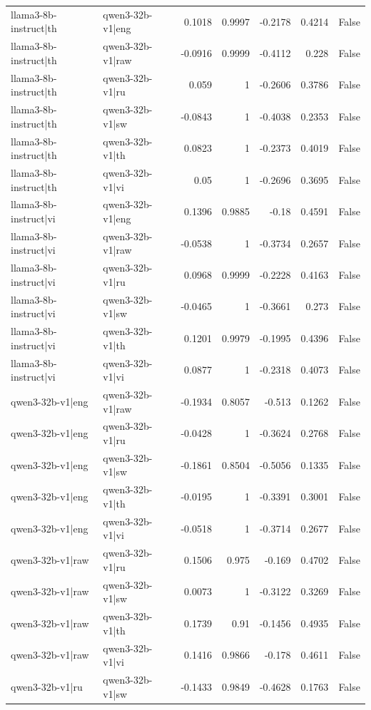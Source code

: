 \begin{table}
\begin{tabular}{l l r r r r l}
llama3-8b-instruct|th & qwen3-32b-v1|eng & 0.1018 & 0.9997 & -0.2178 & 0.4214 & False \\
llama3-8b-instruct|th & qwen3-32b-v1|raw & -0.0916 & 0.9999 & -0.4112 & 0.228 & False \\
llama3-8b-instruct|th & qwen3-32b-v1|ru & 0.059 & 1 & -0.2606 & 0.3786 & False \\
llama3-8b-instruct|th & qwen3-32b-v1|sw & -0.0843 & 1 & -0.4038 & 0.2353 & False \\
llama3-8b-instruct|th & qwen3-32b-v1|th & 0.0823 & 1 & -0.2373 & 0.4019 & False \\
llama3-8b-instruct|th & qwen3-32b-v1|vi & 0.05 & 1 & -0.2696 & 0.3695 & False \\
llama3-8b-instruct|vi & qwen3-32b-v1|eng & 0.1396 & 0.9885 & -0.18 & 0.4591 & False \\
llama3-8b-instruct|vi & qwen3-32b-v1|raw & -0.0538 & 1 & -0.3734 & 0.2657 & False \\
llama3-8b-instruct|vi & qwen3-32b-v1|ru & 0.0968 & 0.9999 & -0.2228 & 0.4163 & False \\
llama3-8b-instruct|vi & qwen3-32b-v1|sw & -0.0465 & 1 & -0.3661 & 0.273 & False \\
llama3-8b-instruct|vi & qwen3-32b-v1|th & 0.1201 & 0.9979 & -0.1995 & 0.4396 & False \\
llama3-8b-instruct|vi & qwen3-32b-v1|vi & 0.0877 & 1 & -0.2318 & 0.4073 & False \\
qwen3-32b-v1|eng & qwen3-32b-v1|raw & -0.1934 & 0.8057 & -0.513 & 0.1262 & False \\
qwen3-32b-v1|eng & qwen3-32b-v1|ru & -0.0428 & 1 & -0.3624 & 0.2768 & False \\
qwen3-32b-v1|eng & qwen3-32b-v1|sw & -0.1861 & 0.8504 & -0.5056 & 0.1335 & False \\
qwen3-32b-v1|eng & qwen3-32b-v1|th & -0.0195 & 1 & -0.3391 & 0.3001 & False \\
qwen3-32b-v1|eng & qwen3-32b-v1|vi & -0.0518 & 1 & -0.3714 & 0.2677 & False \\
qwen3-32b-v1|raw & qwen3-32b-v1|ru & 0.1506 & 0.975 & -0.169 & 0.4702 & False \\
qwen3-32b-v1|raw & qwen3-32b-v1|sw & 0.0073 & 1 & -0.3122 & 0.3269 & False \\
qwen3-32b-v1|raw & qwen3-32b-v1|th & 0.1739 & 0.91 & -0.1456 & 0.4935 & False \\
qwen3-32b-v1|raw & qwen3-32b-v1|vi & 0.1416 & 0.9866 & -0.178 & 0.4611 & False \\
qwen3-32b-v1|ru & qwen3-32b-v1|sw & -0.1433 & 0.9849 & -0.4628 & 0.1763 & False \\

\end{tabular}
\end{table}
